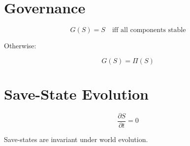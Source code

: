 \section*{Governance}

\[
G(S) = S
\quad \text{iff all components stable}
\]

Otherwise:

\[
G(S) = \Pi(S)
\]


\section*{Save-State Evolution}

\[
\frac{\partial S}{\partial t} = 0
\]

Save‑states are invariant under world evolution.

